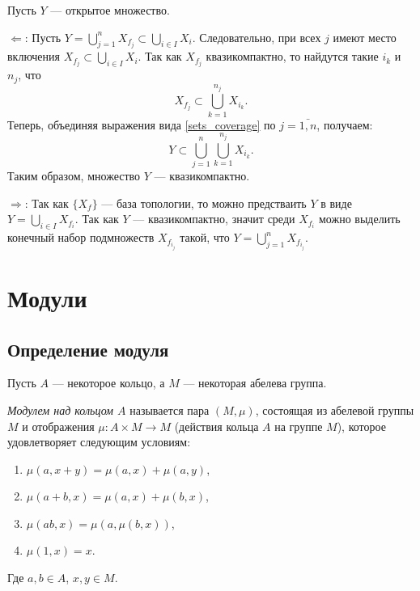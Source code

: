     \begin{Proof}
        Пусть $Y$ --- открытое множество.

        $\Leftarrow$: Пусть $Y = \bigcup_{j = 1}^n X_{f_j} \subset \bigcup_{i \in I} X_i$. Следовательно, при всех $j$ имеют место включения
        $X_{f_j} \subset \bigcup_{i \in I}X_i$. Так как $X_{f_j}$ квазикомпактно, то найдутся такие $i_k$ и $n_j$, что 
        \begin{equation} \label{sets_coverage}
            X_{f_j} \subset \bigcup_{k = 1}^{n_j} X_{i_k}.
        \end{equation}
        Теперь, объединяя выражения вида \eqref{sets_coverage} по $j = \bar{1, n}$, получаем:
        $$
            Y \subset \bigcup_{j = 1}^n \bigcup_{k = 1}^{n_j} X_{i_k}.
        $$
        Таким образом, множество $Y$ --- квазикомпактно.

        $\Rightarrow$: Так как $\{X_f\}$ --- база топологии, то можно предстваить $Y$ в виде $Y = \bigcup_{i \in I} X_{f_i}$. Так как $Y$ --- квазикомпактно, значит среди $X_{f_i}$ можно выделить конечный набор подмножеств 
         $X_{f_{i_j}}$ такой, что $Y = \bigcup_{j = 1}^n X_{f_{i_j}}$.
    \end{Proof}

    \section{Модули}

    \subsection{Определение модуля}

    Пусть $A$ --- некоторое кольцо, а $M$ --- некоторая абелева группа. 
    \begin{Def}
        \textit{Модулем над кольцом $A$} называется пара $(M, \mu)$, состоящая из абелевой группы $M$ и отображения $\mu : A \times M \rightarrow M$ (действия кольца $A$ на группе $M$), 
        которое удовлетворяет следующим условиям:
        \begin{enumerate}
            \item $\mu(a, x + y) = \mu(a, x) + \mu(a, y)$,
            \item $\mu(a + b, x) = \mu(a, x) + \mu(b, x)$,
            \item $\mu(ab, x) = \mu(a, \mu(b, x))$,
            \item $\mu(1, x) = x$.
        \end{enumerate}
        Где $a, b \in A$, $x, y \in M$.
    \end{Def}

